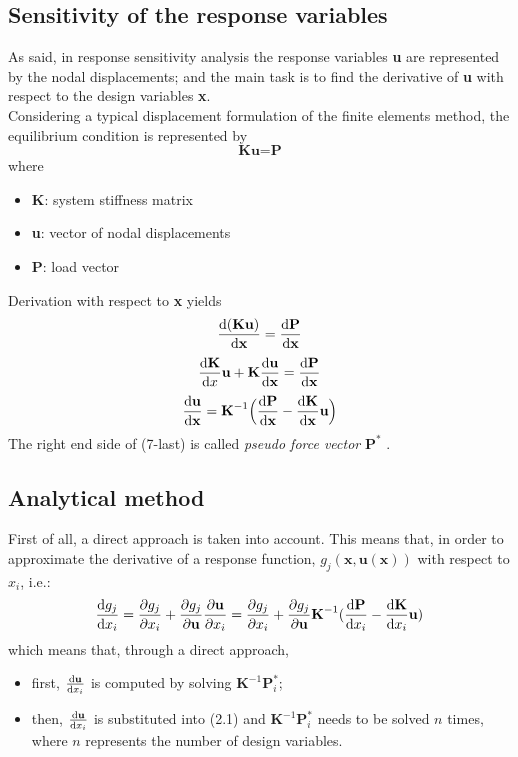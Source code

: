 \subsection{Sensitivity of the response variables}
As said, in response sensitivity analysis the response variables \textbf{u} are represented by the nodal displacements; and the main task is to find the derivative of \textbf{u} with respect to the design variables \textbf{x}.\\Considering a typical displacement formulation of the finite elements method, the equilibrium condition is represented by 
\begin{equation}
\textbf{K}\textbf{u} = \textbf{P}
\end{equation}
where 
\begin{itemize}
\item \textbf{K}: system stiffness matrix 
\item \textbf{u}: vector of nodal displacements
\item \textbf{P}: load vector
\end{itemize}
Derivation with respect to \textbf{x} yields 
\begin{equation}
\dv{(\textbf{K}\textbf{u})}{\textbf{x}} = \dv{\textbf{P}}{\textbf{x}}
\end{equation}
\begin{equation}
\dv{\textbf{K}}{x}\textbf{u} + \textbf{K} \dv{\textbf{u}}{\textbf{x}} = \dv{\textbf{P}}{\textbf{x}}
\end{equation}
\begin{equation}
\dv{\textbf{u}}{\textbf{x}} = \textbf{K}^{-1} \Big(\dv{\textbf{P}}{\textbf{x}} - \dv{\textbf{K}}{\textbf{x}} \textbf{u}\Big)
\end{equation}
The right end side of (7-last) is called \textit{pseudo force vector} $\textbf{P}^{\ast}$ \cite{optimization_Bletzinger}.

\subsection{Analytical method}
First of all, a direct approach is taken into account. This means that, in order to approximate the derivative of a response function, $g_j(\textbf{x}, \textbf{u}(\textbf{x}))$ with respect to $x_i$, i.e.:
\begin{equation} \label{eqn:responsefctderivative}
\dv{g_j}{x_i} = \pdv{g_j}{x_i} + \pdv{g_j}{\textbf{u}} \pdv{\textbf{u}}{x_i} = \pdv{g_j}{x_i} + \pdv{g_j}{\textbf{u}} \textbf{K}^{-1} (\dv{\textbf{P}}{x_i} - \dv{\textbf{K}}{x_i}\textbf{u})
\end{equation}
which means that, through a direct approach, 
\begin {itemize}
\item first, $\dv{\textbf{u}}{x_i}$ is computed by solving $\textbf{K}^{-1}\textbf{P}_i^{\ast}$;
\item then, $\dv{\textbf{u}}{x_i}$ is substituted into (2.1) and $\textbf{K}^{-1}\textbf{P}_i^{\ast}$ needs to be solved $n$ times, where $n$ represents the number of design variables. \cite{optimization_Bletzinger}
\end{itemize}

